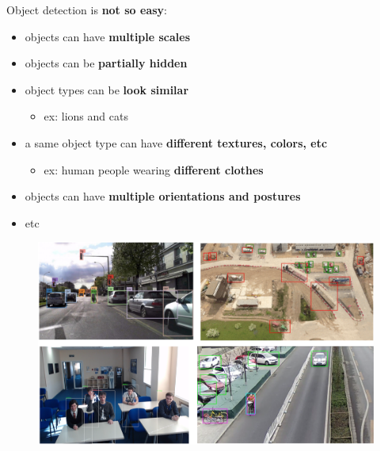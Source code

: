 \documentclass{beamer}[10pt, usepdftitle=false, handout]
\begin{document}
	\begin{frame}
	
	Object detection is \textbf{not so easy}:
	\vspace*{1em}
	
	\begin{itemize}
	
	\item{objects can have \textbf{multiple scales}}	
	\item{objects can be \textbf{partially hidden}}
	\item{object types can be \textbf{look similar}
		\begin{itemize}
		\item{ex: lions and cats}
		\end{itemize}}			
	\item{a same object type can have \textbf{different textures, colors, etc}
		\begin{itemize}
			\item{ex: human people wearing \textbf{different clothes}}
		\end{itemize}
	}
	\item{objects can have \textbf{multiple orientations and postures}}

	\item{etc}
	\end{itemize}
	\vspace*{1em}	
	
	\begin{figure}
		\includegraphics[scale=0.5]{1m.png} 
	\end{figure}
				
    \end{frame}
    
\end{document}
